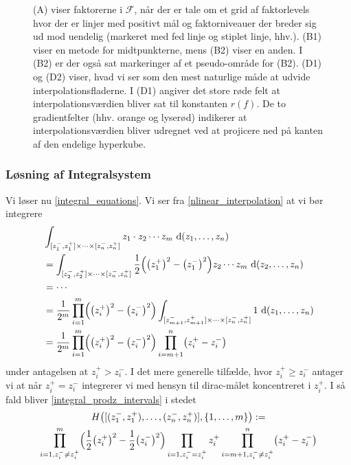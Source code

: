 \documentclass[a4paper, 12pt]{memoir}
\begin{document}
\begin{figure}
\begin{tikzpicture}
\end{tikzpicture}
\caption{(A) viser faktorerne i $\mathcal F$, når der er tale om et grid af faktorlevels hvor der er linjer med positivt mål og faktorniveauer der breder sig ud mod uendelig (markeret med fed linje og stiplet linje, hhv.). (B1) viser en metode for midtpunkterne, mens (B2) viser en anden. I (B2) er der også sat markeringer af et pseudo-område for (B2). (D1) og (D2) viser, hvad vi ser som den mest naturlige måde at udvide interpolationsfladerne. I (D1) angiver det store røde felt at interpolationsværdien bliver sat til konstanten $r(f)$. De to gradientfelter (hhv. orange og lyserød) indikerer at interpolationsværdien bliver udregnet ved at projicere ned på kanten af den endelige hyperkube. 
}\label{hypercubes_placement3}
\end{figure}
\subsubsection{Løsning af Integralsystem}
Vi løser nu \eqref{integral_equations}. Vi ser fra \eqref{nlinear_interpolation} at vi bør integrere
\begin{align}
&\int_{[z_1^-, z_1^+]\times \cdots \times [ z_n^-,z_n^+]}  z_1\cdot z_2\cdots z_m \textup{ d}(z_1, \dots, z_n)\nonumber\\
&=\int_{[z_2^-, z_2^+]\times \cdots \times [ z_n^-,z_n^+]} \frac{1}{2}\Bigl(\bigl(z_1^+\bigr)^2-\bigl(z_1^-\bigr)^2\Bigr)z_2\cdots z_m  \textup{ d}(z_2, \dots, z_n)\nonumber\\
&=\cdots\nonumber\\
&=\frac{1}{2^m}\prod_{i=1}^m \Bigl(\bigl(z_i^+\bigr)^2-\bigl(z_i^-\bigr)^2\Bigr)\int_{[z_{m+1}^-, z_{m+1}^+]\times \cdots \times [ z_n^-,z_n^+]}  1 \textup{ d}(z_1, \dots, z_n)\nonumber\\
&=\frac{1}{2^m}\prod_{i=1}^m \Bigl(\bigl(z_i^+\bigr)^2-\bigl(z_i^-\bigr)^2\Bigr)\prod_{i={m+1}}^n \bigl(z_i^+-z_i^-\bigr)\label{integral_prodz_intervals}
\end{align}
under antagelsen at $z_i^+>z_i^-$. I det mere generelle tilfælde, hvor $z_i^+ \geq z_i^-$ antager vi at når $z_i^+=z_i^-$ integrerer vi med hensyn til dirac-målet koncentreret i $z_i^{+}$. I så fald bliver \eqref{integral_prodz_intervals} i stedet
\begin{gather} 
H\bigl([(z_1^-, z_1^+),\dots, ( z_n^-,z_n^+)], \{1, \dots, m\}\bigr):=\nonumber\\
\prod_{i=1, z_i^{-}\neq z_i^+}^m \Bigl(\frac{1}{2}\bigl(z_i^+\bigr)^2-\frac{1}{2}\bigl(z_i^-\bigr)^2\Bigr)\prod_{i=1,z_i^{-}= z_i^+ } z_i^+ \prod_{i={m+1},z_i^{-}\neq z_i^+ }^n \bigl(z_i^+-z_i^-\bigr)\label{integral_prodz}
\end{gather}
\end{document}
